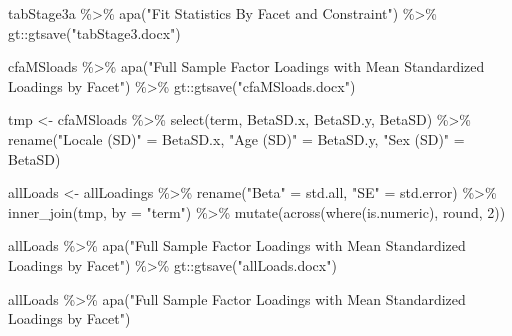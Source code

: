 \documentclass[
  letterpaper,
  DIV=11,
  numbers=noendperiod]{scrartcl}
\newenvironment{Shaded}{\begin{snugshade}}{\end{snugshade}}
\newcommand{\AttributeTok}[1]{\textcolor[rgb]{0.40,0.45,0.13}{#1}}
\newcommand{\DecValTok}[1]{\textcolor[rgb]{0.68,0.00,0.00}{#1}}
\newcommand{\FunctionTok}[1]{\textcolor[rgb]{0.28,0.35,0.67}{#1}}
\newcommand{\NormalTok}[1]{\textcolor[rgb]{0.00,0.23,0.31}{#1}}
\newcommand{\OtherTok}[1]{\textcolor[rgb]{0.00,0.23,0.31}{#1}}
\newcommand{\SpecialCharTok}[1]{\textcolor[rgb]{0.37,0.37,0.37}{#1}}
\newcommand{\StringTok}[1]{\textcolor[rgb]{0.13,0.47,0.30}{#1}}
\begin{document}
\begin{Shaded}
\begin{Highlighting}[]
\NormalTok{tabStage3a }\SpecialCharTok{\%\textgreater{}\%}
  \FunctionTok{apa}\NormalTok{(}\StringTok{"Fit Statistics By Facet and Constraint"}\NormalTok{) }\SpecialCharTok{\%\textgreater{}\%}
\NormalTok{  gt}\SpecialCharTok{::}\FunctionTok{gtsave}\NormalTok{(}\StringTok{"tabStage3.docx"}\NormalTok{)}



\NormalTok{cfaMSloads }\SpecialCharTok{\%\textgreater{}\%}
  \FunctionTok{apa}\NormalTok{(}\StringTok{"Full Sample Factor Loadings with Mean Standardized Loadings by Facet"}\NormalTok{) }\SpecialCharTok{\%\textgreater{}\%}
\NormalTok{  gt}\SpecialCharTok{::}\FunctionTok{gtsave}\NormalTok{(}\StringTok{"cfaMSloads.docx"}\NormalTok{)}


\NormalTok{tmp }\OtherTok{\textless{}{-}}\NormalTok{ cfaMSloads }\SpecialCharTok{\%\textgreater{}\%}
  \FunctionTok{select}\NormalTok{(term, BetaSD.x, BetaSD.y, BetaSD) }\SpecialCharTok{\%\textgreater{}\%}
  \FunctionTok{rename}\NormalTok{(}\StringTok{"Locale (SD)"} \OtherTok{=}\NormalTok{ BetaSD.x,}
         \StringTok{"Age (SD)"} \OtherTok{=}\NormalTok{ BetaSD.y,}
         \StringTok{"Sex (SD)"} \OtherTok{=}\NormalTok{ BetaSD)}



\NormalTok{allLoads }\OtherTok{\textless{}{-}}\NormalTok{ allLoadings }\SpecialCharTok{\%\textgreater{}\%}
  \FunctionTok{rename}\NormalTok{(}\StringTok{"Beta"} \OtherTok{=}\NormalTok{ std.all,}
         \StringTok{"SE"} \OtherTok{=}\NormalTok{ std.error) }\SpecialCharTok{\%\textgreater{}\%}
  \FunctionTok{inner\_join}\NormalTok{(tmp, }\AttributeTok{by =} \StringTok{"term"}\NormalTok{) }\SpecialCharTok{\%\textgreater{}\%}
  \FunctionTok{mutate}\NormalTok{(}\FunctionTok{across}\NormalTok{(}\FunctionTok{where}\NormalTok{(is.numeric), round, }\DecValTok{2}\NormalTok{))}
  
\NormalTok{allLoads }\SpecialCharTok{\%\textgreater{}\%}
  \FunctionTok{apa}\NormalTok{(}\StringTok{"Full Sample Factor Loadings with Mean Standardized Loadings by Facet"}\NormalTok{) }\SpecialCharTok{\%\textgreater{}\%}
\NormalTok{  gt}\SpecialCharTok{::}\FunctionTok{gtsave}\NormalTok{(}\StringTok{"allLoads.docx"}\NormalTok{)}

\NormalTok{allLoads }\SpecialCharTok{\%\textgreater{}\%}
  \FunctionTok{apa}\NormalTok{(}\StringTok{"Full Sample Factor Loadings with Mean Standardized Loadings by Facet"}\NormalTok{)}
\end{Highlighting}
\end{Shaded}
\end{document}
